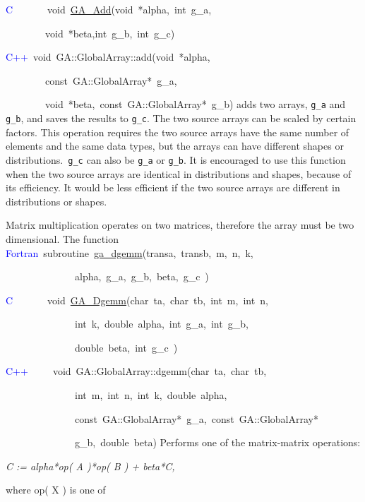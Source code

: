 \textcolor{blue}{C}~~~~~~~void~\href{http://www.emsl.pnl.gov/docs/global/c_nga_ops.html\#ga_add}{GA\_{}Add}(void~{*}alpha,~int~g\_a,~

~~~~~~~~void~{*}beta,int~g\_b,~int~g\_c)~

\textcolor{blue}{C++}~void~GA::GlobalArray::add(void~{*}alpha,~~

~~~~~~~~const~GA::GlobalArray{*}~g\_a,~

~~~~~~~~void~{*}beta,~const~GA::GlobalArray{*}~g\_b)
adds two arrays, \texttt{g\_a} and \texttt{g\_b}, and saves the results
to \texttt{g\_c}. The two source arrays can be scaled by certain factors.
This operation requires the two source arrays have the same number
of elements and the same data types, but the arrays can have different
shapes or distributions.\texttt{ g\_c} can also be \texttt{g\_a} or
\texttt{g\_b}. It is encouraged to use this function when the two
source arrays are identical in distributions and shapes, because of
its efficiency. It would be less efficient if the two source arrays
are different in distributions or shapes.

Matrix multiplication operates on two matrices, therefore the array
must be two dimensional. The function
\textcolor{blue}{Fortran}~subroutine~\href{http://www.emsl.pnl.gov/docs/global/ga_ops.html\#ga_dgemm}{ga\_{}dgemm}(transa,~transb,~m,~n,~k,~

~~~~~~~~~~~~~~alpha,~g\_a,~g\_b,~beta,~g\_c~)~

\textcolor{blue}{C}~~~~~~~void~\href{http://www.emsl.pnl.gov/docs/global/c_nga_ops.html\#ga_dgemm}{GA\_{}Dgemm}(char~ta,~char~tb,~int~m,~int~n,~

~~~~~~~~~~~~~~int~k,~double~alpha,~int~g\_a,~int~g\_b,~

~~~~~~~~~~~~~~double~beta,~int~g\_c~)~

\textcolor{blue}{C++}~~~~~void~GA::GlobalArray::dgemm(char~ta,~char~tb,~

~~~~~~~~~~~~~~int~m,~int~n,~int~k,~double~alpha,~

~~~~~~~~~~~~~~const~GA::GlobalArray{*}~g\_a,~const~GA::GlobalArray{*}~

~~~~~~~~~~~~~~g\_b,~double~beta)
Performs one of the matrix-matrix operations:

\emph{C := alpha{*}op( A ){*}op( B ) + beta{*}C,}

where op( X ) is one of

